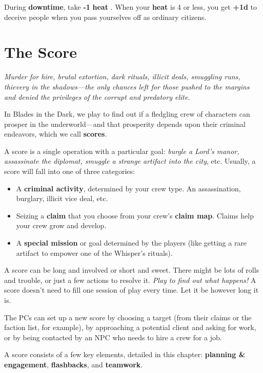 \documentclass[11pt,oneside]{book}
\newcommand{\gameterm}[1]{\textbf{#1}}
\begin{document}
During \textbf{downtime}, take \textbf{-1 }\gameterm{heat} . When your \gameterm{heat}  is 4 or less, you get \textbf{+1d} to deceive people when you pass yourselves off as ordinary citizens.

\part{The Score}

\emph{Murder for hire, brutal extortion, dark rituals, illicit deals, smuggling runs, thievery in the shadows---the only chances left for those pushed to the margins and denied the privileges of the corrupt and predatory elite.}

In Blades in the Dark, we play to find out if a fledgling crew of characters can prosper in the underworld---and that prosperity depends upon their criminal endeavors, which we call \textbf{scores}.

A score is a single operation with a particular goal: \emph{burgle a Lord’s manor, assassinate the diplomat, smuggle a strange artifact into the city}, etc. Usually, a score will fall into one of three categories:

\begin{itemize}
	\item A \textbf{criminal activity}, determined by your crew type. An assassination, burglary, illicit vice deal, etc.
	\item Seizing a \textbf{claim} that you choose from your crew’s \textbf{claim map}. Claims help your crew grow and develop.
	\item A \textbf{special mission} or goal determined by the players (like getting a rare artifact to empower one of the Whisper’s rituals).
\end{itemize}

A score can be long and involved or short and sweet. There might be lots of rolls and trouble, or just a few actions to resolve it. \emph{Play to find out what happens!} A score doesn’t need to fill one session of play every time. Let it be however long it is.

The PCs can set up a new score by choosing a target (from their claims or the faction list, for example), by approaching a potential client and asking for work, or by being contacted by an NPC who needs to hire a crew for a job.

A score consists of a few key elements, detailed in this chapter: \textbf{planning \& engagement}, \textbf{flashbacks}, and \textbf{teamwork}.
\end{document}
